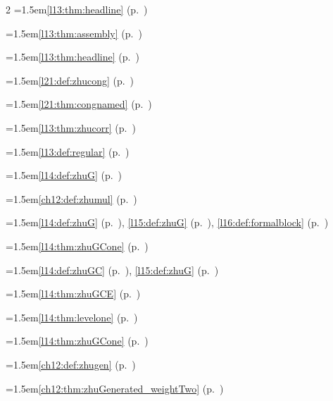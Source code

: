 \begin{multicols}{2}
\hangindent=1.5em\quad \ref{l13:thm:headline} (p.~\pageref{l13:thm:headline})\par
\hangindent=1.5em\quad \ref{l13:thm:assembly} (p.~\pageref{l13:thm:assembly})\par
\hangindent=1.5em\quad \ref{l13:thm:headline} (p.~\pageref{l13:thm:headline})\par
\hangindent=1.5em\quad \ref{l21:def:zhucong} (p.~\pageref{l21:def:zhucong})\par
\hangindent=1.5em\quad \ref{l21:thm:congnamed} (p.~\pageref{l21:thm:congnamed})\par
\hangindent=1.5em\quad \ref{l13:thm:zhucorr} (p.~\pageref{l13:thm:zhucorr})\par
\hangindent=1.5em\quad \ref{l13:def:regular} (p.~\pageref{l13:def:regular})\par
\hangindent=1.5em\quad \ref{l14:def:zhuG} (p.~\pageref{l14:def:zhuG})\par
\hangindent=1.5em\quad \ref{ch12:def:zhumul} (p.~\pageref{ch12:def:zhumul})\par
\hangindent=1.5em\quad \ref{l14:def:zhuG} (p.~\pageref{l14:def:zhuG}), \ref{l15:def:zhuG} (p.~\pageref{l15:def:zhuG}), \ref{l16:def:formalblock} (p.~\pageref{l16:def:formalblock})\par
\hangindent=1.5em\quad \ref{l14:thm:zhuGCone} (p.~\pageref{l14:thm:zhuGCone})\par
\hangindent=1.5em\quad \ref{l14:def:zhuGC} (p.~\pageref{l14:def:zhuGC}), \ref{l15:def:zhuG} (p.~\pageref{l15:def:zhuG})\par
\hangindent=1.5em\quad \ref{l14:thm:zhuGCE} (p.~\pageref{l14:thm:zhuGCE})\par
\hangindent=1.5em\quad \ref{l14:thm:levelone} (p.~\pageref{l14:thm:levelone})\par
\hangindent=1.5em\quad \ref{l14:thm:zhuGCone} (p.~\pageref{l14:thm:zhuGCone})\par
\hangindent=1.5em\quad \ref{ch12:def:zhugen} (p.~\pageref{ch12:def:zhugen})\par
\hangindent=1.5em\quad \ref{ch12:thm:zhuGenerated_weightTwo} (p.~\pageref{ch12:thm:zhuGenerated_weightTwo})\par

\end{multicols}
